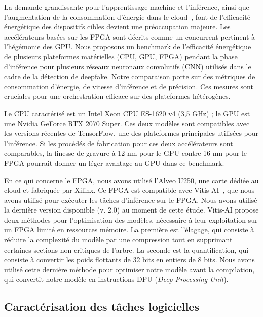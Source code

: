 La demande grandissante pour l'apprentissage machine et l'inférence, ainsi que l'augmentation de la consommation d'énergie dans le cloud~\cite{masanetRecalibratingGlobalData2020}, font de l'efficacité énergétique des dispositifs cibles devient une préoccupation majeure. Les accélérateurs basées sur les FPGA sont décrits comme un concurrent pertinent à l'hégémonie des GPU. Nous proposons un benchmark de l'efficacité énergétique de plusieurs plateformes matérielles (CPU, GPU, FPGA) pendant la phase d'inférence pour plusieurs réseaux neuronaux convolutifs (CNN) utilisés dans le cadre de la détection de deepfake. Notre comparaison porte sur des métriques de consommation d'énergie, de vitesse d'inférence et de précision. Ces mesures sont cruciales pour une orchestration efficace sur des plateformes hétérogènes.

Le CPU caractérisé est un Intel Xeon CPU ES-1620 v4 (3,5 GHz) ; le GPU est une Nvidia GeForce RTX 2070 Super. Ces deux modèles sont compatibles avec les versions récentes de TensorFlow, une des plateformes principales utilisées pour l'inférence. Si les procédés de fabrication pour ces deux accélérateurs sont comparables, la finesse de gravure à 12 nm pour le GPU contre 16 nm pour le FPGA pourrait donner un léger avantage au GPU dans ce benchmark.

En ce qui concerne le FPGA, nous avons utilisé l'Alveo U250, une carte dédiée au cloud et fabriquée par Xilinx. Ce FPGA est compatible avec Vitis-AI~\cite{vitis-ai}, que nous avons utilisé pour exécuter les tâches d'inférence sur le FPGA. Nous avons utilisé la dernière version disponible (v. 2.0) au moment de cette étude. Vitis-AI propose deux méthodes pour l'optimisation des modèles, nécessaire à leur exploitation sur un FPGA limité en ressources mémoire. La première est l'élagage, qui consiste à réduire la complexité du modèle par une compression tout en supprimant certaines sections non critiques de l'arbre. La seconde est la quantification, qui consiste à convertir les poids flottants de 32 bits en entiers de 8 bits. Nous avons utilisé cette dernière méthode pour optimiser notre modèle avant la compilation, qui convertit notre modèle en instructions DPU (\textit{Deep Processing Unit}).

\subsection{Caractérisation des tâches logicielles}
\label{section:herofake-offline:workload}

